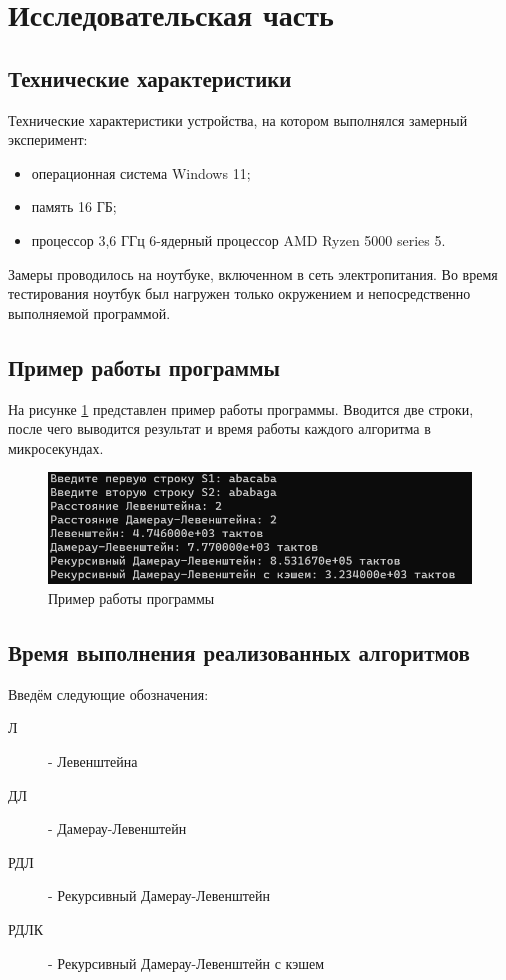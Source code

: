 \section{Исследовательская часть}

\subsection{Технические характеристики}

Технические характеристики устройства, на котором выполнялся замерный эксперимент:
\begin{itemize}[label*=---]
	\item операционная система Windows 11;
	\item память 16 ГБ;
	\item процессор 3,6 ГГц 6-ядерный процессор AMD Ryzen 5000 series 5.
\end{itemize}

Замеры проводилось на ноутбуке, включенном в сеть электропитания. Во время тестирования ноутбук был нагружен только окружением и непосредственно выполняемой программой.

\subsection{Пример работы программы}

На рисунке \ref{img:example} представлен пример работы программы. Вводится две строки, после чего выводится результат и время работы каждого алгоритма в микросекундах. 

\begin{figure}[!h]
	\centering
	\includegraphics[width=130mm]{images/example}
	\caption{Пример работы программы}
	\label{img:example}
\end{figure}

\pagebreak
\newpage
\subsection{Время выполнения реализованных алгоритмов}

Введём следующие обозначения:
\begin{description}
	\item[Л] - Левенштейна
	\item[ДЛ] - Дамерау-Левенштейн
	\item[РДЛ] - Рекурсивный Дамерау-Левенштейн
	\item[РДЛК] - Рекурсивный Дамерау-Левенштейн с кэшем
\end{description}

